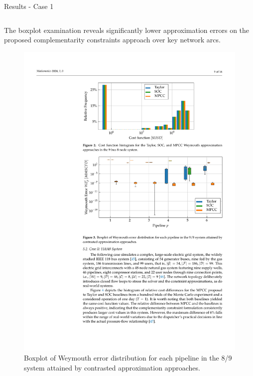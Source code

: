 \documentclass[hyperref={colorlinks,citecolor=blue,linkcolor=blue,urlcolor=blue}]{beamer}
\newlength\figureheight
\newlength\figurewidth
\begin{document}
\begin{frame}{Results - Case 1}
\begin{columns}[t,onlytextwidth]
    \begin{column}{0.48\textwidth}
        The boxplot examination reveals significantly lower approximation errors on the proposed complementarity constraints approach over key network arcs.
        
        \vspace{2.5em}
        \begin{figure}[H]
            \centering
            \setlength{}        
            \setlength{}
            \includegraphics[width=\figurewidth, height=\figureheight]{figures/case1_error.pdf} %
            \caption{\scriptsize Boxplot of Weymouth error distribution for each pipeline in the 8/9 system attained by contrasted approximation approaches.}
            \label{fig:blue_test_boxplot}
        \end{figure}
    \end{column}
\end{columns}
\end{frame}
\end{document}
